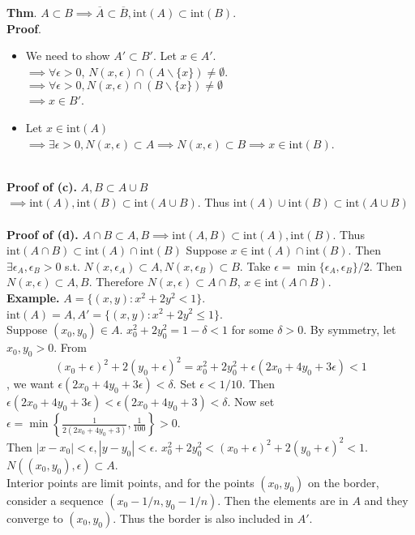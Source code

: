 \documentclass[12pt]{report}
\newcommand{\abs}[1]{\left|#1\right|}
\newcommand{\ds}{\displaystyle}
\newcommand{\inte}{\mathrm{int}}
\begin{document}
\pagebreak
\textbf{Thm}. $A\subset B \implies \overline{A}\subset \overline{B}, \inte(A)\subset \inte(B)$.\\
\textbf{Proof}. 
\begin{itemize}
	\item We need to show $A'\subset B'$. Let $x\in A'$.\\
	$\implies$$\forall \epsilon > 0$, $N(x, \epsilon)\cap (A\backslash \{x\}) \neq\emptyset$. \\
	$\implies \forall \epsilon > 0, N(x, \epsilon)\cap (B\backslash \{x\})\neq \emptyset$\\
	$\implies x\in B'$.
	\item Let $x\in \inte(A)$\\
	$\implies \exists \epsilon > 0, N(x, \epsilon) \subset A \implies N(x, \epsilon) \subset B \implies x\in \inte(B)$.
\end{itemize}
~\\
\textbf{Proof of (c).} $A, B\subset A\cup B$ \\$\implies \inte(A), \inte(B)\subset \inte(A\cup B)$. Thus $\inte(A)\cup \inte(B)\subset \inte(A\cup B)$\\
\\
\textbf{Proof of (d).} $A\cap B \subset A, B \implies \inte(A, B) \subset \inte(A), \inte(B)$. Thus $\inte(A\cap B)\subset \inte(A)\cap \inte(B)$
Suppose $x\in \inte(A)\cap \inte(B)$. Then $\exists \epsilon_A, \epsilon_B > 0$ s.t. $N(x, \epsilon_A)\subset A, N(x, \epsilon_B)\subset B$. Take $\epsilon = \min\{\epsilon_A, \epsilon_B \}/ 2$. Then $N(x, \epsilon) \subset A, B$. Therefore $N(x, \epsilon) \subset A\cap B$, $x\in \inte(A\cap B)$.
~\\
\textbf{Example.} $A = \{(x, y):x^2+2y^2<1 \}$. $\inte(A) = A, A' = \{(x, y): x^2+2y^2\leq 1 \}$.\\
Suppose $(x_0, y_0) \in A$. $x_0^2 + 2y_0^2 = 1-\delta < 1$ for some $\delta >0$. By symmetry, let $x_0, y_0 >0$. From
$$(x_0+\epsilon)^2 + 2(y_0+\epsilon)^2 = x_0^2 +2y_0^2 + \epsilon(2x_0 + 4y_0 + 3\epsilon) < 1$$
, we want $\epsilon(2x_0+4y_0+3\epsilon) < \delta$. Set $\epsilon < 1/10$. Then $\epsilon(2x_0 + 4y_0 + 3\epsilon) < \epsilon(2x_0 + 4y_0 +3) < \delta$. Now set $\epsilon = \min\left\{\ds \frac{1}{2 (2x_0+4y_0+3)}, \frac{1}{100}\right\} > 0$.\\ Then $\abs{x - x_0}<\epsilon, \abs{y-y_0}<\epsilon$. $x_0^2+2y_0^2 < (x_0+\epsilon) ^2 + 2(y_0+\epsilon)^2 <1$. $N((x_0, y_0), \epsilon) \subset A$.\\
Interior points are limit points, and for the points $(x_0, y_0)$ on the border, consider a sequence $(x_0-1/n, y_0-1/n)$. Then the elements are in $A$ and they converge to $(x_0, y_0)$. Thus the border is also included in $A'$.
\pagebreak
\end{document}
